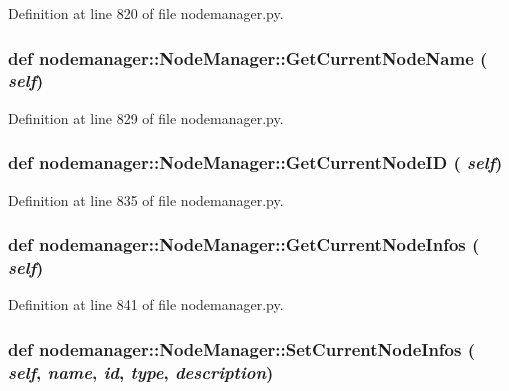 Definition at line 820 of file nodemanager.py.\hypertarget{classnodemanager_1_1NodeManager_e2bbc613898b9926f47be95072c64160}{
\subsubsection[GetCurrentNodeName]{\setlength{\rightskip}{0pt plus 5cm}def nodemanager::Node\-Manager::Get\-Current\-Node\-Name ( {\em self})}}
\label{classnodemanager_1_1NodeManager_e2bbc613898b9926f47be95072c64160}




Definition at line 829 of file nodemanager.py.\hypertarget{classnodemanager_1_1NodeManager_72f10793222cbd6d4b621ce748acf141}{
\subsubsection[GetCurrentNodeID]{\setlength{\rightskip}{0pt plus 5cm}def nodemanager::Node\-Manager::Get\-Current\-Node\-ID ( {\em self})}}
\label{classnodemanager_1_1NodeManager_72f10793222cbd6d4b621ce748acf141}




Definition at line 835 of file nodemanager.py.\hypertarget{classnodemanager_1_1NodeManager_9305e3ffee31917d098f2131301ec1a5}{
\subsubsection[GetCurrentNodeInfos]{\setlength{\rightskip}{0pt plus 5cm}def nodemanager::Node\-Manager::Get\-Current\-Node\-Infos ( {\em self})}}
\label{classnodemanager_1_1NodeManager_9305e3ffee31917d098f2131301ec1a5}




Definition at line 841 of file nodemanager.py.\hypertarget{classnodemanager_1_1NodeManager_300207ada996fc01af2b3a2ab882d799}{
\subsubsection[SetCurrentNodeInfos]{\setlength{\rightskip}{0pt plus 5cm}def nodemanager::Node\-Manager::Set\-Current\-Node\-Infos ( {\em self},  {\em name},  {\em id},  {\em type},  {\em description})}}
\label{classnodemanager_1_1NodeManager_300207ada996fc01af2b3a2ab882d799}




